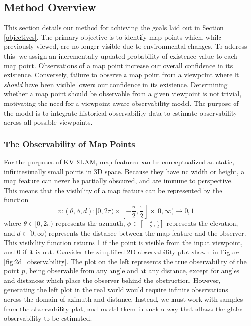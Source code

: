 \subsection{Method Overview}

This section details our method for achieving the goals laid out in Section \ref{objectives}. The primary objective is to identify map points which, while previously viewed, are no longer visible due to environmental changes. To address this, we assign an incrementally updated probability of existence value to each map point. Observations of a map point increase our overall confidence in its existence. Conversely, failure to observe a map point from a viewpoint where it \textit{should} have been visible lowers our confidence in its existence. Determining whether a map point should be observable from a given viewpoint is not trivial, motivating the need for a viewpoint-aware observability model. The purpose of the model is to integrate historical observability data to estimate observability across all possible viewpoints.

\subsubsection{The Observability of Map Points}

For the purposes of KV-SLAM, map features can be conceptualized as static, infinitesimally small points in 3D space. Because they have no width or height, a map feature can never be partially obscured, and are immune to perspective. This means that the visibility of a map feature can be represented by the function
$$
    v:(\theta,\phi,d):[0,2\pi)\times\left[-\frac{\pi}{2},\frac{\pi}{2}\right]\times[0,\infty)\to{0,1}
$$
where $\theta\in[0,2\pi)$ represents the azimuth, $\phi\in\left[-\frac{\pi}{2},\frac{\pi}{2}\right]$ represents the elevation, and $d\in[0,\infty)$ represents the distance between the map feature and the observer. This visibility function returns 1 if the point is visible from the input viewpoint, and 0 if it is not. Consider the simplified 2D observability plot shown in Figure \ref{fig:2d_observability}. The plot on the left represents the true observability of the point $p$, being observable from any angle and at any distance, except for angles and distances which place the observer behind the obstruction. However, generating the left plot in the real world would require infinite observations across the domain of azimuth and distance. Instead, we must work with samples from the observability plot, and model them in such a way that allows the global observability to be estimated.


